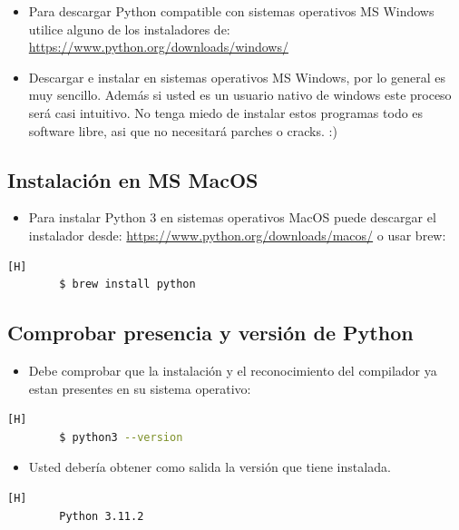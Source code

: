 \documentclass{article}
\begin{document}
	
	\begin{itemize}	
		\item Para descargar Python compatible con sistemas operativos MS Windows utilice alguno de los instaladores de: \url{https://www.python.org/downloads/windows/}
		\item Descargar e instalar en sistemas operativos MS Windows, por lo general es muy sencillo. Además si usted es un usuario nativo de windows este proceso será casi intuitivo. No tenga miedo de instalar estos programas todo es software libre, asi que no necesitará parches o cracks. :)
	\end{itemize}
	
	\subsection{Instalación en MS MacOS}
	
	\begin{itemize}	
		\item Para instalar Python 3 en sistemas operativos MacOS puede descargar el instalador desde: \url{https://www.python.org/downloads/macos/} o usar brew:
	\end{itemize}
	
	\begin{lstlisting}[language=bash,caption={Instalar Python en MacOS}][H]
		$ brew install python
	\end{lstlisting}
	
	\subsection{Comprobar presencia y versión de Python}
	\begin{itemize}
		\item Debe comprobar que la instalación y el reconocimiento del compilador ya estan presentes en su sistema operativo:
	\end{itemize}
	
	\begin{lstlisting}[language=bash,caption={Verificando presencia y versión de Python}][H]
		$ python3 --version
	\end{lstlisting}
	
	\begin{itemize}
		\item Usted debería obtener como salida la versión que tiene instalada.
	\end{itemize}
	\begin{lstlisting}[language=bash,caption={Verificando presencia y versión de Python}][H]
		Python 3.11.2
	\end{lstlisting}
	
\end{document}
